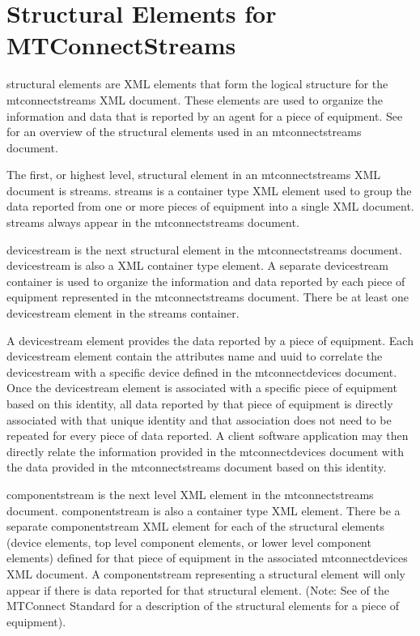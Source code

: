 \documentclass{mtconnect}	%
\begin{document}
\section{Structural Elements for MTConnectStreams}
\label{sec:Structural Elements for MTConnectStreams}
\lstset{numbers=left,xleftmargin=2em}

\glspl{structural element} are XML elements that form the logical structure for the \gls{mtconnectstreams} XML document.  These elements are used to organize the information and data that is reported by an \gls{agent} for a piece of equipment.  See  for an overview of the \glspl{structural element} used in an \gls{mtconnectstreams} document.

The first, or highest level, \gls{structural element} in an \gls{mtconnectstreams} XML document is \gls{streams}. \gls{streams} is a container type XML element used to group the data reported from one or more pieces of equipment into a single XML document.  \gls{streams} \must always appear in the \gls{mtconnectstreams} document.

\gls{devicestream} is the next \gls{structural element} in the \gls{mtconnectstreams} document. \gls{devicestream} is also a XML container type element.   A separate \gls{devicestream} container is used to organize the information and data reported by each piece of equipment represented in the \gls{mtconnectstreams} document.  There \must be at least one \gls{devicestream} element in the \gls{streams} container.  

A \gls{devicestream} element provides the data reported by a piece of equipment.  Each \gls{devicestream} element \must contain the attributes \gls{name} and \gls{uuid} to correlate the \gls{devicestream} with a specific \gls{device} defined in the \gls{mtconnectdevices} document.  Once the \gls{devicestream} element is associated with a specific piece of equipment based on this identity, all data reported by that piece of equipment is directly associated with that unique identity and that association does not need to be repeated for every piece of data reported.  A client software application may then directly relate the information provided in the \gls{mtconnectdevices} document with the data provided in the \gls{mtconnectstreams} document based on this identity.

\gls{componentstream} is the next level XML element in the \gls{mtconnectstreams} document.  \gls{componentstream} is also a container type XML element.   There \must be a separate \gls{componentstream} XML element for each of the \glspl{structural element} (\gls{device} elements, \gls{top level} \gls{component} elements, or \gls{lower level} \gls{component} elements) defined for that piece of equipment in the associated \gls{mtconnectdevices} XML document.  A \gls{componentstream} representing a \gls{structural element} will only appear if there is data reported for that \gls{structural element}.  (Note:  See  of the MTConnect Standard for a description of the \glspl{structural element} for a piece of equipment).   
\end{document}
